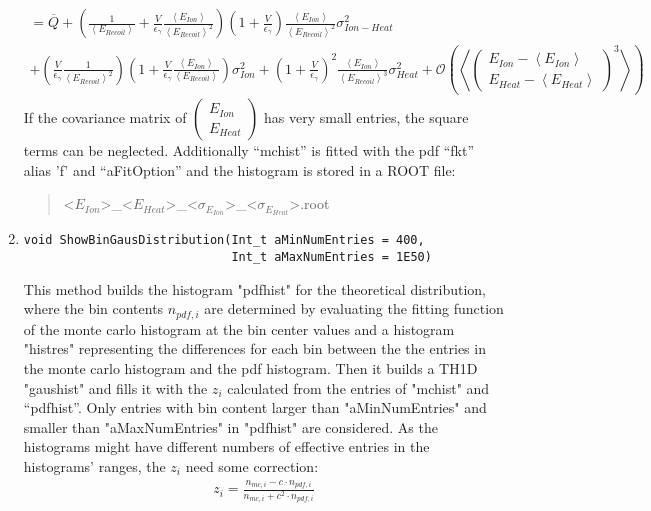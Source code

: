 \documentclass[10pt, a4paper]{article}
\newcommand{\mean}[1]{\left \langle #1 \right \rangle}
\begin{document}
\begin{enumerate}
\begin{gather}
= \overline{Q} + \left( \frac{1}{\mean{E_{Recoil}}} + \frac{V}{\epsilon_\gamma} \frac{\mean{E_{Ion}}}{\mean{E_{Recoil}}^2} \right) \left( 1 + \frac{V}{\epsilon_\gamma} \right) \frac{\mean{E_{Ion}}}{\mean{E_{Recoil}}^2} \sigma_{Ion-Heat}^2 \\ +  \left( \frac{V}{\epsilon_\gamma} \frac{1}{\mean{E_{Recoil}}^2} \right) \left( 1 +  \frac{V}{\epsilon_\gamma} \frac{\mean{E_{Ion}}}{\mean{E_{Recoil}}} \right) \sigma_{Ion}^2 + \left(1 + \frac{V}{\epsilon_\gamma} \right)^2 \frac{\mean{E_{Ion}}}{\mean{E_{Recoil}}^3} \sigma_{Heat}^2 + \mathcal O \left(\mean{ \begin{pmatrix} E_{Ion} - \mean{E_{Ion}} \\ E_{Heat} - \mean{E_{Heat}} \end{pmatrix}^3} \right)
\end{gather}
If the covariance matrix of $\begin{pmatrix} E_{Ion} \\ E_{Heat} \end{pmatrix}$ has very small entries, the square terms can be neglected.
Additionally "`mchist"' is fitted with the pdf "`fkt"' alias 'f' and "`aFitOption"' and the histogram is stored in a ROOT file:
\begin{quote}
<$E_{Ion}$>\_<$E_{Heat}$>\_<$\sigma_{E_{Ion}}$>\_<$\sigma_{E_{Heat}}$>.root
\end{quote}
\item
\begin{verbatim}
void ShowBinGausDistribution(Int_t aMinNumEntries = 400,
                             Int_t aMaxNumEntries = 1E50)
\end{verbatim}
This method builds the histogram "pdfhist" for the theoretical distribution, where the bin contents $n_{pdf,i}$ are determined by evaluating the fitting function of the monte carlo histogram at the bin center values and a histogram "histres" representing the differences for each bin between the the entries in the monte carlo histogram and the pdf histogram. Then it builds a TH1D "gaushist" and fills it with the $z_i$ calculated from the entries of "mchist" and "`pdfhist"'. Only entries with bin content larger than "aMinNumEntries" and smaller than "aMaxNumEntries" in "pdfhist" are considered. As the histograms might have different numbers of effective entries in the histograms' ranges, the $z_i$ need some correction:
\begin{gather}
z_i = \frac{n_{mc,i} - c \cdot n_{pdf,i}}{n_{mc,i} + c^2 \cdot n_{pdf,i}}
\end{gather} 

\end{enumerate}
\end{document}
